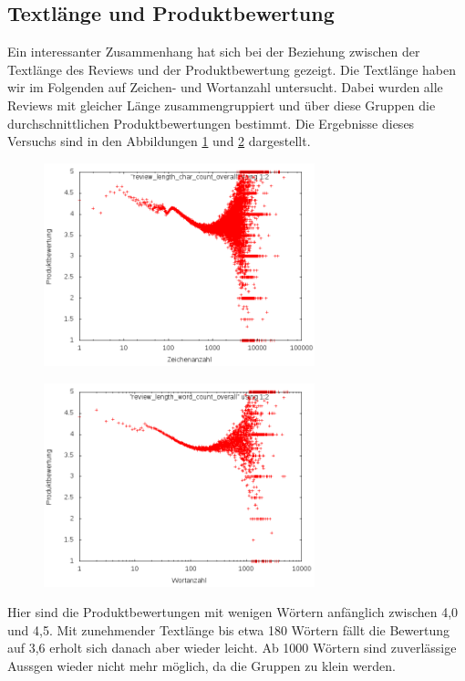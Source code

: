 \documentclass{scrartcl}
\theoremstyle{my_th_style}
\begin{document}
\subsection{Textlänge und Produktbewertung}
Ein interessanter Zusammenhang hat sich bei der Beziehung zwischen der Textlänge des Reviews und der Produktbewertung gezeigt. Die Textlänge haben wir im Folgenden auf Zeichen- und  Wortanzahl untersucht. Dabei wurden alle Reviews mit gleicher Länge zusammengruppiert und über diese Gruppen die durchschnittlichen Produktbewertungen bestimmt. Die Ergebnisse dieses Versuchs sind in den Abbildungen \ref{fig_char_rating} und \ref{fig_word_rating} dargestellt.
\begin{figure}
\centering
    \includegraphics[width=0.7\textwidth]{_results/char_rating.png}
	\label{fig_char_rating}
\end{figure}
\begin{figure}
\centering
    \includegraphics[width=0.7\textwidth]{_results/word_rating.png}
	\label{fig_word_rating}
\end{figure}
Hier sind die Produktbewertungen mit wenigen Wörtern anfänglich zwischen 4,0 und 4,5. Mit zunehmender Textlänge bis etwa 180 Wörtern fällt die Bewertung auf 3,6 erholt sich danach aber wieder leicht. Ab 1000 Wörtern sind zuverlässige Aussgen wieder nicht mehr möglich, da die Gruppen zu klein werden.
\end{document}
